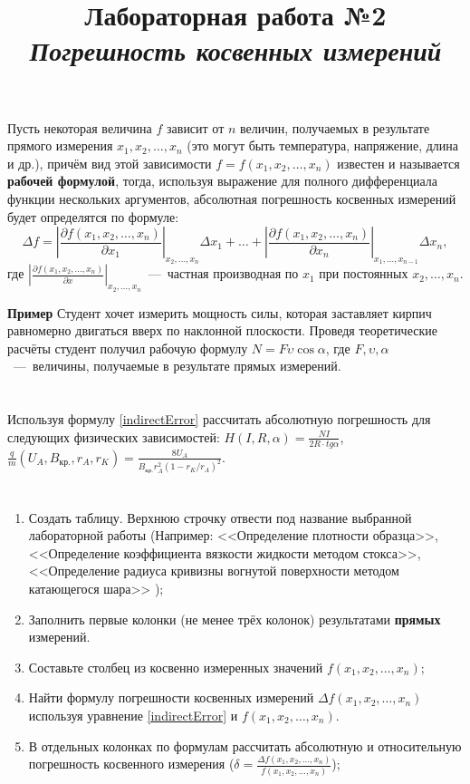\documentclass[14pt,a4paper]{article}
\title{Лабораторная работа №2 \\ \textit{Погрешность косвенных измерений}}
\begin{document}
\maketitle
Пусть некоторая величина $f$ зависит от $n$ величин, получаемых в результате прямого измерения  $x_1, x_2, \ldots, x_n$ (это могут быть температура, напряжение, длина и др.), причём вид этой зависимости $f = f(x_1, x_2, \ldots, x_n)$ известен и называется \textbf{рабочей формулой}, тогда, используя выражение для полного дифференциала функции нескольких аргументов, абсолютная погрешность косвенных измерений будет определятся по формуле:
\begin{equation} \label{indirectError}
    \Delta f = \left | \frac{\partial f(x_1, x_2, \ldots, x_n)}{\partial x_1} \right |_{x_2, \ldots, x_n} \Delta x_1 + \ldots + \left | \frac{\partial f(x_1, x_2, \ldots, x_n)}{\partial x_n} \right |_{x_1, \ldots, x_{n-1}} \Delta x_n,
\end{equation}
где $\left | \frac{\partial f(x_1, x_2, \ldots, x_n)}{\partial x} \right |_{x_2, \ldots, x_n}$~---~частная производная по $x_1$ при постоянных $x_2, \ldots, x_n$.

\textbf{Пример}
Студент хочет измерить мощность силы, которая заставляет кирпич равномерно двигаться вверх по наклонной плоскости. Проведя теоретические расчёты студент получил рабочую формулу $N = F\upsilon\cos{\alpha}$, где $F, \upsilon, \alpha$~---~величины, получаемые в результате прямых измерений.


\progress{}
\section{}
Используя формулу \ref{indirectError} рассчитать абсолютную погрешность для следующих физических зависимостей:
$H(I,R,\alpha) = \frac{NI}{2R\cdot tg\alpha}$, $\frac{q}{m}(U_A, B_\text{кр.}, r_A, r_K) = \frac{8U_A}{B_\text{кр.}r_A^2(1-r_K/r_A)^2}$. \\
\section{}
\begin{enumerate}
    \item Создать таблицу. Верхнюю строчку отвести под название выбранной лабораторной работы (Например: <<Определение плотности образца>>, <<Определение  коэффициента вязкости жидкости  методом стокса>>, <<Определение радиуса кривизны вогнутой поверхности методом катающегося шара>> );
    \item Заполнить первые колонки (не менее трёх колонок) результатами \textbf{прямых} измерений.
    \item Составьте столбец из косвенно измеренных значений $f(x_1, x_2, \ldots, x_n)$;
    \item Найти формулу погрешности косвенных измерений $\Delta f(x_1, x_2, \ldots, x_n)$ используя уравнение \ref{indirectError} и $f(x_1, x_2, \ldots, x_n)$. 
    \item В отдельных колонках по формулам рассчитать абсолютную и относительную погрешность косвенного измерения ($\delta  = \frac{\Delta f(x_1, x_2, \ldots, x_n)}{f(x_1, x_2, \ldots, x_n)}$);
\end{enumerate}
\end{document}
